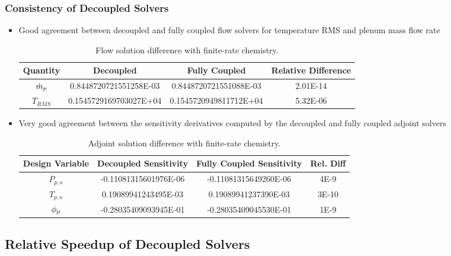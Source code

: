 \documentclass{beamer}
\begin{document}
\begin{frame}
  \frametitle{Consistency of Decoupled Solvers}
  \begin{itemize}
    \item Good agreement between decoupled and fully coupled flow solvers for
      temperature RMS and plenum mass flow rate
    \begin{table}
      \tiny
      \centering
      \begin{tabular}{c|c|c|c}
        Quantity & Decoupled & Fully Coupled & Relative Difference \\
        \hline
        $\dot{m}_p$ & 0.8448720721551258E-03 & 0.8448720721551088E-03 & 2.01E-14 \\
        $T_{RMS}$   & 0.1545729169703027E+04 & 0.1545720949811712E+04 & 5.32E-06
      \end{tabular}
      \caption{Flow solution difference with finite-rate chemistry.}
    \end{table}
    \item Very good agreement between the sensitivity derivatives computed by
      the decoupled and fully coupled adjoint solvers
\begin{table}[h]
  \tiny
  \centering
  \begin{tabular}{c|c|c|c}
    Design Variable & Decoupled Sensitivity & Fully Coupled Sensitivity & Rel. Diff\\
    \hline
    $P_{p,o}$ & -0.11081315601976E-06 & -0.11081315649260E-06 & 4E-9  \\
    $T_{p,o}$ &  0.19089941243495E-03 &  0.19089941237390E-03 & 3E-10 \\
    $\phi_p$     & -0.28035409093945E-01 & -0.28035409045530E-01 & 1E-9
  \end{tabular}
  \caption{Adjoint solution difference with finite-rate chemistry.}
\end{table}
  \end{itemize}
\end{frame}

\subsection{Relative Speedup of Decoupled Solvers}
\end{document}
